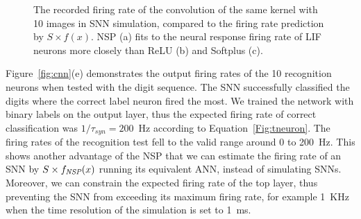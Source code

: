 \begin{figure}[tbh!]
\begin{subfigure}[t]{0.6\textwidth}
		\end{subfigure}
		\caption{
			The recorded firing rate of the convolution of the same kernel with 10 images in SNN simulation, compared to the firing rate prediction by $S \times f(x)$.
			NSP (a) fits to the neural response firing rate of LIF neurons more closely than ReLU (b) and Softplus (c).}
		\label{fig:af_compare}
	\end{figure}
	
	Figure~\ref{fig:cnn}(e) demonstrates the output firing rates of the 10 recognition neurons when tested with the digit sequence.
	The SNN successfully classified the digits where the correct label neuron fired the most.
	We trained the network with binary labels on the output layer, thus the expected firing rate of correct classification was $1/\tau_{syn}=200$~Hz according to Equation~\ref{Fig:tneuron}.
	The firing rates of the recognition test fell to the valid range around 0 to 200~Hz.
	This shows another advantage of the NSP that we can estimate the firing rate of an SNN by $S \times f_{\textit{\textrm{NSP}}}(x)$ running its equivalent ANN, instead of simulating SNNs.
	Moreover, we can constrain the expected firing rate of the top layer, thus preventing the SNN from exceeding its maximum firing rate, for example 1~KHz when the time resolution of the simulation is set to 1~ms.
	
